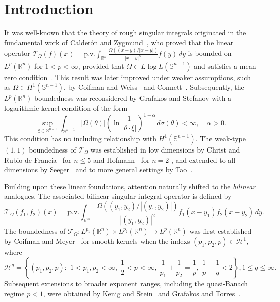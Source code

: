 \documentclass[11pt]{amsart}
\begin{document}
\section{\bf Introduction}


It was well-known that the theory of rough singular integrals originated  in the fundamental work of Calder\'on and Zygmund~\cite{calderon_existence_1952}, who proved that the linear operator 
$	\mathcal {T}_\Omega(f)(x) = \text{p.v.} \int_{\mathbb{R}^{n}} \frac{\Omega((x-y)/|x-y|)}{|x-y|^n} f( y)\, dy$
is bounded on $L^p(\mathbb{R}^n)$ for $1 < p < \infty$, provided that $\Omega \in L \log L(\mathbb{S}^{n-1})$ and satisfies a mean zero condition~\cite{calderon_singular_1956}. This result was later improved under weaker assumptions, such as $\Omega \in H^1(\mathbb{S}^{n-1})$, by Coifman and Weiss~\cite{coifman_extensions_1977} and Connett~\cite{connett_singular_1979}. Subsequently, the $L^p(\mathbb{R}^n)$ boundedness was reconsidered by Grafakos and Stefanov  \cite{grafakos1998lp} with  a logarithmic kernel condition of the form
\begin{equation}\label{grafakos_cond}
	\sup_{\xi \in \mathbb{S}^{n-1}} \int_{\mathbb{S}^{n-1}} |\Omega(\theta)|
	\left(\ln \frac{1}{|\theta \cdot \xi|}\right)^{1+\alpha} \, d\sigma(\theta) < \infty, \quad \alpha > 0.
\end{equation}
This condition has no including relationship with $ H^1(\mathbb{S}^{n-1})$. 
The weak-type $(1,1)$ boundedness of $\mathcal {T}_\Omega$ was established in low dimensions by Christ and Rubio de Francia~\cite{christ_weak_1988-1} for $n\le 5 $ and Hofmann~\cite{hofmann_weighted_1988} for $n=2$ , and extended to all dimensions by Seeger~\cite{seeger_singular_1996} and to more general settings by Tao~\cite{Tao1999}. 

Building upon these linear foundations, attention naturally shifted to the \emph{bilinear} analogues. The associated bilinear singular integral operator is defined by
\begin{equation}\label{T}
\mathcal	{T}_\Omega(f_1, f_2)(x) = \text{p.v.} \int_{\mathbb{R}^{2n}} \frac{\Omega((y_1, y_2)/|(y_1, y_2)|)}{|(y_1, y_2)|^2} f_1(x - y_1) f_2(x - y_2)\, dy.
\end{equation}
The boundedness of $\mathcal {T}_\Omega \colon L^{p_1}(\mathbb{R}^n) \times L^{p_2}(\mathbb{R}^n) \to L^p(\mathbb{R}^n)$ was first established by Coifman and Meyer~\cite{coifman_commutators_1975} for smooth kernels when the indexs  $(p_1,p_2,p)\in\mathcal{H}^1$, where 
\[\mathcal{H}^q=\left\{(p_1,p_2,p):\;1<p_1,p_2<\infty,\;\frac{1}{2}<p<\infty,\;\frac{1}{p_1}+\frac{1}{p_2}=\frac{1}{p},\;\frac{1}{p}+\frac{1}{q}<2\right\},1\le q\le \infty.\]Subsequent extensions to broader exponent ranges, including the quasi-Banach regime $p < 1$, were obtained by Kenig and Stein~\cite{Kenig1999} and Grafakos and Torres~\cite{Grafakos2002}. 
\end{document}
